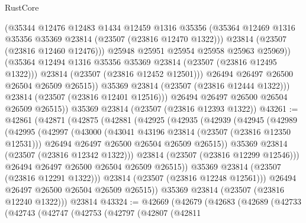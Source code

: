 \begin{lexlean}{RustCore}
\begin{coremodule}
                      (@35344
                        @12476
                        @12483
                        @1434
                        @12459
                        @1316
                        @35356
                        (@35364 @12469 @1316 @35356 @35369 @23814 (@23507 (@23816 @12470 @1322)))
                        @23814
                        (@23507 (@23816 @12460 @12476)))
                      @25948
                      @25951
                      @25954
                      @25958
                      @25963
                      @25969))
                  (@35364 @12494 @1316 @35356 @35369 @23814 (@23507 (@23816 @12495 @1322)))
                  @23814
                  (@23507 (@23816 @12452 @12501)))
                @26494
                @26497
                @26500
                @26504
                @26509
                @26515))
            @35369
            @23814
            (@23507 (@23816 @12444 @1322)))
          @23814
          (@23507 (@23816 @12401 @12516)))
        @26494
        @26497
        @26500
        @26504
        @26509
        @26515))
    @35369
    @23814
    (@23507 (@23816 @12393 @1322))
@43261 := @42861
    (@42871
      (@42875
        (@42881
          (@42925
            (@42935
              (@42939
                (@42945
                  (@42989
                    (@42995
                      (@42997
                        (@43000
                          (@43041 @43196 @23814 (@23507 (@23816 @12350 @12531)))
                          @26494
                          @26497
                          @26500
                          @26504
                          @26509
                          @26515))
                      @35369
                      @23814
                      (@23507 (@23816 @12342 @1322)))
                    @23814
                    (@23507 (@23816 @12299 @12546)))
                  @26494
                  @26497
                  @26500
                  @26504
                  @26509
                  @26515))
              @35369
              @23814
              (@23507 (@23816 @12291 @1322)))
            @23814
            (@23507 (@23816 @12248 @12561)))
          @26494
          @26497
          @26500
          @26504
          @26509
          @26515))
      @35369
      @23814
      (@23507 (@23816 @12240 @1322)))
    @23814
@43324 := @42669
    (@42679
      (@42683
        (@42689
          (@42733
            (@42743
              (@42747
                (@42753
                  (@42797
                    (@42807
                      (@42811

\end{coremodule}
\end{lexlean}
